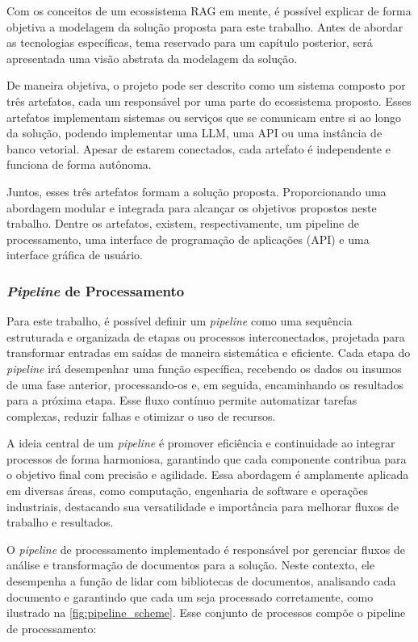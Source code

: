 \documentclass[a4paper, 12pt]{article}
\begin{document}
    Com os conceitos de um ecossistema RAG em mente, é possível explicar de forma objetiva a modelagem da solução proposta para este trabalho. Antes de abordar as tecnologias específicas, tema reservado para um capítulo posterior, será apresentada uma visão abstrata da modelagem da solução.

    De maneira objetiva, o projeto pode ser descrito como um sistema composto por três artefatos, cada um responsável por uma parte do ecossistema proposto. Esses artefatos implementam sistemas ou serviços que se comunicam entre si ao longo da solução, podendo implementar uma LLM, uma API ou uma instância de banco vetorial. Apesar de estarem conectados, cada artefato é independente e funciona de forma autônoma.
    
    Juntos, esses três artefatos formam a solução proposta. Proporcionando uma abordagem modular e integrada para alcançar os objetivos propostos neste trabalho. Dentre os artefatos, existem, respectivamente, um pipeline de processamento, uma interface de programação de aplicações (API) e uma interface gráfica de usuário.
    
    \subsubsection{\textit{Pipeline} de Processamento} \label{sec:pipeline}

    Para este trabalho, é possível definir um \textit{pipeline} como uma sequência estruturada e organizada de etapas ou processos interconectados, projetada para transformar entradas em saídas de maneira sistemática e eficiente. Cada etapa do \textit{pipeline} irá desempenhar uma função específica, recebendo os dados ou insumos de uma fase anterior, processando-os e, em seguida, encaminhando os resultados para a próxima etapa. Esse fluxo contínuo permite automatizar tarefas complexas, reduzir falhas e otimizar o uso de recursos. 
    
    A ideia central de um \textit{pipeline} é promover eficiência e continuidade ao integrar processos de forma harmoniosa, garantindo que cada componente contribua para o objetivo final com precisão e agilidade. Essa abordagem é amplamente aplicada em diversas áreas, como computação, engenharia de software e operações industriais, destacando sua versatilidade e importância para melhorar fluxos de trabalho e resultados. 

    O \textit{pipeline} de processamento implementado é responsável por gerenciar fluxos de análise e transformação de documentos para a solução. Neste contexto, ele desempenha a função de lidar com bibliotecas de documentos, analisando cada documento e garantindo que cada um seja processado corretamente, como ilustrado na \autoref{fig:pipeline_scheme}. Esse conjunto de processos compõe o pipeline de processamento:
    
\end{document}
